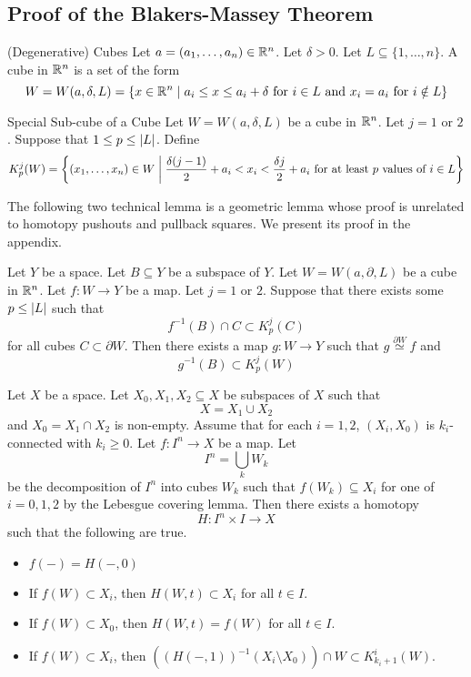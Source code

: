 \subsection{Proof of the Blakers-Massey Theorem}\label{ss:BMT}
\begin{defn}{(Degenerative) Cubes}{} Let $a=(a_1,\dots,a_n)\in\mathbb{R}^n$. Let $\delta>0$. Let $L\subseteq\{1,\dots,n\}$. A cube in $\mathbb{R}^n$ is a set of the form $$W=W(a,\delta,L)=\{x\in\mathbb{R}^n\;|\;a_i\leq x\leq a_i+\delta\text{ for }i\in L\text{ and }x_i=a_i\text{ for }i\notin L\}$$
\end{defn}

\begin{defn}{Special Sub-cube of a Cube}{} Let $W=W(a,\delta,L)$ be a cube in $\mathbb{R}^n$. Let $j=1$ or $2$. Suppose that $1\leq p\leq\abs{L}$. Define $$K_p^j(W)=\left\{(x_1,\dots,x_n)\in W\;\bigg{|}\;\frac{\delta(j-1)}{2}+a_i<x_i<\frac{\delta j}{2}+a_i\text{ for at least }p\text{ values of }i\in L\right\}$$
\end{defn}

The following two technical lemma is a geometric lemma whose proof is unrelated to homotopy pushouts and pullback squares. We present its proof in the appendix. 

\begin{lmm}{}{} Let $Y$ be a space. Let $B\subseteq Y$ be a subspace of $Y$. Let $W=W(a,\partial, L)$ be a cube in $\mathbb{R}^n$. Let $f:W\to Y$ be a map. Let $j=1$ or $2$. Suppose that there exists some $p\leq\abs{L}$ such that $$f^{-1}(B)\cap C\subset K_p^j(C)$$ for all cubes $C\subset\partial W$. Then there exists a map $g:W\to Y$ such that $g\overset{\partial W}{\simeq} f$ and $$g^{-1}(B)\subset K_p^j(W)$$ 
\end{lmm}

\begin{lmm}{}{} Let $X$ be a space. Let $X_0,X_1,X_2\subseteq X$ be subspaces of $X$ such that $$X=X_1\cup X_2$$ and $X_0=X_1\cap X_2$ is non-empty. Assume that for each $i=1,2$, $(X_i,X_0)$ is $k_i$-connected with $k_i\geq 0$. Let $f:I^n\to X$ be a map. Let $$I^n=\bigcup_k W_k$$ be the decomposition of $I^n$ into cubes $W_k$ such that $f(W_k)\subseteq X_i$ for one of $i=0,1,2$ by the Lebesgue covering lemma. Then there exists a homotopy $$H:I^n\times I\to X$$ such that the following are true. 
\begin{itemize}
\item $f(-)=H(-,0)$
\item If $f(W)\subset X_i$, then $H(W,t)\subset X_i$ for all $t\in I$. 
\item If $f(W)\subset X_0$, then $H(W,t)=f(W)$ for all $t\in I$. 
\item If $f(W)\subset X_i$, then $\left((H(-,1))^{-1}(X_i\setminus X_0)\right)\cap W\subset K_{k_i+1}^i(W)$. 
\end{itemize} 
\end{lmm}

